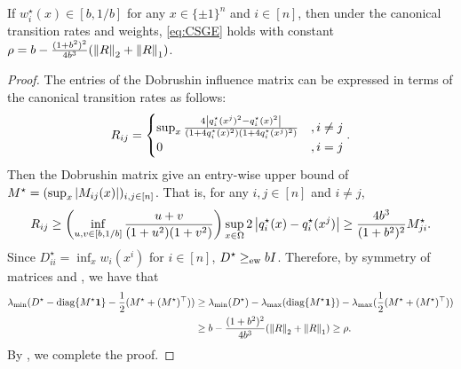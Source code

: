 \begin{lemma}[]\label{lem:Dobrushin_upper_bound_CSGE}
     If $w_i^\star(x) \in [b,1/b]$ for any $x\in \{\pm 1\}^n$ and $i\in[n]$, then under the canonical transition rates and weights, \ref{eq:CSGE} holds with constant $\rho = b - \frac{(1+b^2)^2}{4b^3}(\norm{R}_2 + \norm{R}_1)$.
\end{lemma}
\begin{proof}
    The entries of the Dobrushin influence matrix can be expressed in terms of the canonical transition rates as follows:
    $$
        R_{ij} = \begin{cases}
            \sup_x \frac{4\abs{q_i^\star(x^j)^2-q_i^\star(x)^2}}{(1+4q_i^\star(x)^2)(1 + 4q_i^\star(x^j)^2)} &, i\neq j
            \\ 0 &, i = j
        \end{cases} .
    $$
    Then the Dobrushin matrix give an entry-wise upper bound of $M^\star = (\sup_x \abs{M_{ij}(x)})_{i,j\in[n]}$.
    That is, for any $i, j\in[n]$ and $i\neq j$,
    \begin{align}\label{eq:Dobrushin_to_CSGE_constant}
        R_{ij} \geq \tp{\inf_{u,v\in [b,1/b]}\frac{u+v}{(1+u^2)(1+v^2)}}\sup_{x\in \Omega}2\abs{q_i^\star(x)-q_i^\star(x^j)} \geq \frac{4b^3}{(1+b^2)^2}M^\star_{ji} .
    \end{align}
    Since $D^\star_{ii} = \inf_x w_i(x^i)$ for $i\in[n]$, $D^\star\geq_{\-{ew}} bI$.
    Therefore, by symmetry of matrices and , we have that
    \begin{align*}
        \lambda_{\min}(D^\star-\diag\{M^\star\*1\}-\frac{1}{2}(M^\star+(M^\star)^\top)) &\geq \lambda_{\min}(D^\star) - \lambda_{\max}(\diag\{M^\star\*1\}) - \lambda_{\max}(\frac{1}{2}(M^\star+(M^\star)^\top)) 
        \\&\geq b - \frac{(1+b^2)^2}{4b^3}(\norm{R}_2 + \norm{R}_1)  \geq \rho.
    \end{align*}
    By , we complete the proof.
\end{proof}

